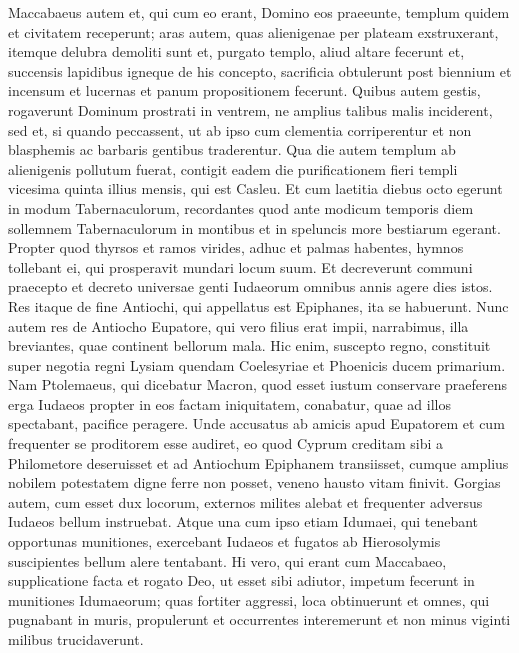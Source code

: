 \begin{biblechapter}  
\verse Maccabaeus autem et, qui cum eo erant, Domino eos praeeunte, templum quidem et civitatem receperunt; 
\verse aras autem, quas alienigenae per plateam exstruxerant, itemque delubra demoliti sunt 
\verse et, purgato templo, aliud altare fecerunt et, succensis lapidibus igneque de his concepto, sacrificia obtulerunt post biennium et incensum et lucernas et panum propositionem fecerunt. 
\verse Quibus autem gestis, rogaverunt Dominum prostrati in ventrem, ne amplius talibus malis inciderent, sed et, si quando peccassent, ut ab ipso cum clementia corriperentur et non blasphemis ac barbaris gentibus traderentur.  
\verse Qua die autem templum ab alienigenis pollutum fuerat, contigit eadem die purificationem fieri templi vicesima quinta illius mensis, qui est Casleu. 
\verse Et cum laetitia diebus octo egerunt in modum Tabernaculorum, recordantes quod ante modicum temporis diem sollemnem Tabernaculorum in montibus et in speluncis more bestiarum egerant. 
\verse Propter quod thyrsos et ramos virides, adhuc et palmas habentes, hymnos tollebant ei, qui prosperavit mundari locum suum. 
\verse Et decreverunt communi praecepto et decreto universae genti Iudaeorum omnibus annis agere dies istos. 
\verse Res itaque de fine Antiochi, qui appellatus est Epiphanes, ita se habuerunt. 
\verse Nunc autem res de Antiocho Eupatore, qui vero filius erat impii, narrabimus, illa breviantes, quae continent bellorum mala. 
\verse Hic enim, suscepto regno, constituit super negotia regni Lysiam quendam Coelesyriae et Phoenicis ducem primarium. 
\verse Nam Ptolemaeus, qui dicebatur Macron, quod esset iustum conservare praeferens erga Iudaeos propter in eos factam iniquitatem, conabatur, quae ad illos spectabant, pacifice peragere. 
\verse Unde accusatus ab amicis apud Eupatorem et cum frequenter se proditorem esse audiret, eo quod Cyprum creditam sibi a Philometore deseruisset et ad Antiochum Epiphanem transiisset, cumque amplius nobilem potestatem digne ferre non posset, veneno hausto vitam finivit. 
\verse Gorgias autem, cum esset dux locorum, externos milites alebat et frequenter adversus Iudaeos bellum instruebat. 
\verse Atque una cum ipso etiam Idumaei, qui tenebant opportunas munitiones, exercebant Iudaeos et fugatos ab Hierosolymis suscipientes bellum alere tentabant. 
\verse Hi vero, qui erant cum Maccabaeo, supplicatione facta et rogato Deo, ut esset sibi adiutor, impetum fecerunt in munitiones Idumaeorum; 
\verse quas fortiter aggressi, loca obtinuerunt et omnes, qui pugnabant in muris, propulerunt et occurrentes interemerunt et non minus viginti milibus trucidaverunt. 

\end{biblechapter}
